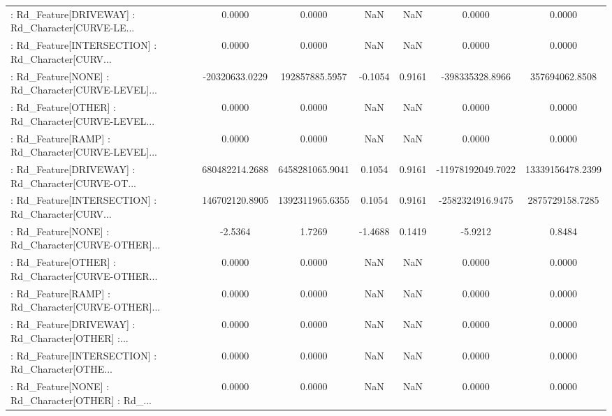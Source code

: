 \begin{longtable}{p{4cm}cccccc}
 : Rd\_Feature[DRIVEWAY] : Rd\_Character[CURVE-LE... &            0.0000 &            0.0000 &     NaN &          NaN &             0.0000 &            0.0000 \\
 : Rd\_Feature[INTERSECTION] : Rd\_Character[CURV... &            0.0000 &            0.0000 &     NaN &          NaN &             0.0000 &            0.0000 \\
 : Rd\_Feature[NONE] : Rd\_Character[CURVE-LEVEL]... &    -20320633.0229 &    192857885.5957 & -0.1054 &       0.9161 &    -398335328.8966 &    357694062.8508 \\
 : Rd\_Feature[OTHER] : Rd\_Character[CURVE-LEVEL... &            0.0000 &            0.0000 &     NaN &          NaN &             0.0000 &            0.0000 \\
 : Rd\_Feature[RAMP] : Rd\_Character[CURVE-LEVEL]... &            0.0000 &            0.0000 &     NaN &          NaN &             0.0000 &            0.0000 \\
 : Rd\_Feature[DRIVEWAY] : Rd\_Character[CURVE-OT... &    680482214.2688 &   6458281065.9041 &  0.1054 &       0.9161 &  -11978192049.7022 &  13339156478.2399 \\
 : Rd\_Feature[INTERSECTION] : Rd\_Character[CURV... &    146702120.8905 &   1392311965.6355 &  0.1054 &       0.9161 &   -2582324916.9475 &   2875729158.7285 \\
 : Rd\_Feature[NONE] : Rd\_Character[CURVE-OTHER]... &           -2.5364 &            1.7269 & -1.4688 &       0.1419 &            -5.9212 &            0.8484 \\
 : Rd\_Feature[OTHER] : Rd\_Character[CURVE-OTHER... &            0.0000 &            0.0000 &     NaN &          NaN &             0.0000 &            0.0000 \\
 : Rd\_Feature[RAMP] : Rd\_Character[CURVE-OTHER]... &            0.0000 &            0.0000 &     NaN &          NaN &             0.0000 &            0.0000 \\
 : Rd\_Feature[DRIVEWAY] : Rd\_Character[OTHER] :... &            0.0000 &            0.0000 &     NaN &          NaN &             0.0000 &            0.0000 \\
 : Rd\_Feature[INTERSECTION] : Rd\_Character[OTHE... &            0.0000 &            0.0000 &     NaN &          NaN &             0.0000 &            0.0000 \\
 : Rd\_Feature[NONE] : Rd\_Character[OTHER] : Rd\_... &            0.0000 &            0.0000 &     NaN &          NaN &             0.0000 &            0.0000 \\

\end{longtable}
